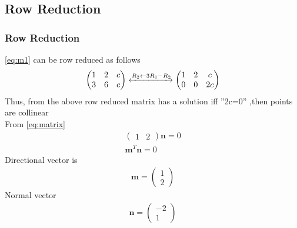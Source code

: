 \documentclass{beamer}
\theoremstyle{remark}
\providecommand{\norm}[1]{\lVert#1\rVert}
\newcommand{\myvec}[1]{\ensuremath{\begin{pmatrix}#1\end{pmatrix}}}
\let\vec\mathbf
\numberwithin{equation}{section}
\begin{document}
\subsection{Row Reduction}
\begin{frame}
\frametitle{Row Reduction}
\eqref{eq:m1} can be row reduced as follows
%
\begin{align}
    \label{eq:rowred}
    \myvec{1&2&c\\3&6&c}\xleftrightarrow[]{R_2 \leftarrow {3R_1}-{R_2}}
\myvec{1 &  2& c\\0 &  0 & 2c }
\end{align}
Thus, from the above row reduced matrix has a solution iff ”2c=0” ,then points are collinear \\
From \eqref{eq:matrix} \\
\begin{align}
    \myvec{1&2}\vec{n}=0 \\
    \vec{m}^T\vec{n}=0
\end{align}
    Directional vector is 
\begin{align}
    \vec{m} = \myvec{1 \\ 2}
\end{align}
    Normal vector 
\begin{align}
    \vec{n}= \myvec{-2\\1} \label{eq:nT}
\end{align}
%
\end{frame}
\end{document}
